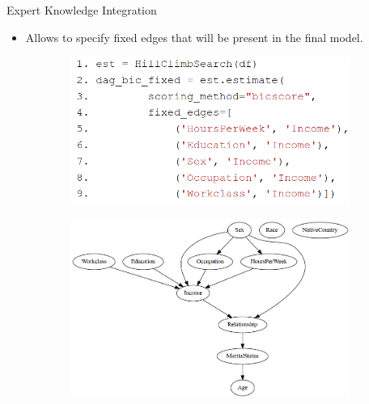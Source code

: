 \documentclass{beamer}
\begin{document}
\begin{frame}{Expert Knowledge Integration}
	\begin{itemize}
		\item Allows to specify fixed edges that will be present in the final model.
	\end{itemize}

	\begin{figure}
		\begin{subfigure}{0.5 \textwidth}
			\centering
			\includegraphics[scale=0.28]{imgs/adult_fixed.png}
		\end{subfigure}%
		\begin{subfigure}{0.5 \textwidth}
			\centering
			\includegraphics[scale=0.3]{imgs/adult_bic_fixed.png}
		\end{subfigure}
	\end{figure}
\end{frame}

\end{document}
